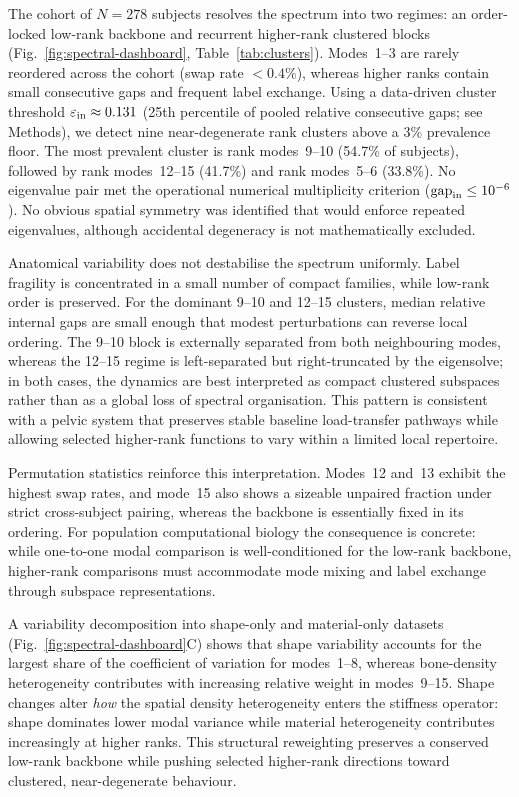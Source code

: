 \documentclass[11pt]{article}
\begin{document}
The cohort of $N{=}278$ subjects resolves the spectrum into two regimes: an order-locked low-rank backbone and recurrent higher-rank clustered blocks (Fig.~\ref{fig:spectral-dashboard}, Table~\ref{tab:clusters}).
Modes~1--3 are rarely reordered across the cohort (swap rate $<0.4\%$), whereas higher ranks contain small consecutive gaps and frequent label exchange.
Using a data-driven cluster threshold $\varepsilon_{\rm in}\approx 0.131$ (25th percentile of pooled relative consecutive gaps; see Methods), we detect nine near-degenerate rank clusters above a 3\% prevalence floor.
The most prevalent cluster is rank modes~9--10 (54.7\% of subjects), followed by rank modes~12--15 (41.7\%) and rank modes~5--6 (33.8\%).
No eigenvalue pair met the operational numerical multiplicity criterion ($\mathrm{gap}_{\rm in} \le 10^{-6}$). No obvious spatial symmetry was identified that would enforce repeated eigenvalues, although accidental degeneracy is not mathematically excluded.

Anatomical variability does not destabilise the spectrum uniformly.
Label fragility is concentrated in a small number of compact families, while low-rank order is preserved.
For the dominant 9--10 and 12--15 clusters, median relative internal gaps are small enough that modest perturbations can reverse local ordering.
The 9--10 block is externally separated from both neighbouring modes, whereas the 12--15 regime is left-separated but right-truncated by the eigensolve; in both cases, the dynamics are best interpreted as compact clustered subspaces rather than as a global loss of spectral organisation.
This pattern is consistent with a pelvic system that preserves stable baseline load-transfer pathways while allowing selected higher-rank functions to vary within a limited local repertoire.

Permutation statistics reinforce this interpretation.
Modes~12 and~13 exhibit the highest swap rates, and mode~15 also shows a sizeable unpaired fraction under strict cross-subject pairing, whereas the backbone is essentially fixed in its ordering.
For population computational biology the consequence is concrete: while one-to-one modal comparison is well-conditioned for the low-rank backbone, higher-rank comparisons must accommodate mode mixing and label exchange through subspace representations.

A variability decomposition into shape-only and material-only datasets (Fig.~\ref{fig:spectral-dashboard}C) shows that shape variability accounts for the largest share of the coefficient of variation for modes~1--8, whereas bone-density heterogeneity contributes with increasing relative weight in modes~9--15.
Shape changes alter \emph{how} the spatial density heterogeneity enters the stiffness operator: shape dominates lower modal variance while material heterogeneity contributes increasingly at higher ranks.
This structural reweighting preserves a conserved low-rank backbone while pushing selected higher-rank directions toward clustered, near-degenerate behaviour.
\end{document}
